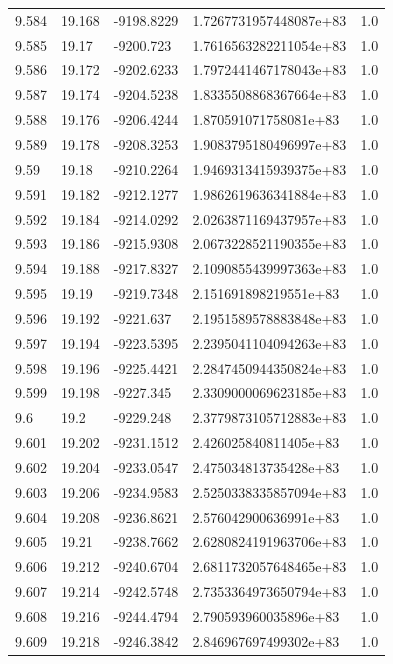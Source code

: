 \begin{tabular}{lllll}
9.584 & 19.168 & -9198.8229 & 1.7267731957448087e+83 & 1.0 \\
9.585 & 19.17 & -9200.723 & 1.7616563282211054e+83 & 1.0 \\
9.586 & 19.172 & -9202.6233 & 1.7972441467178043e+83 & 1.0 \\
9.587 & 19.174 & -9204.5238 & 1.8335508868367664e+83 & 1.0 \\
9.588 & 19.176 & -9206.4244 & 1.870591071758081e+83 & 1.0 \\
9.589 & 19.178 & -9208.3253 & 1.9083795180496997e+83 & 1.0 \\
9.59 & 19.18 & -9210.2264 & 1.9469313415939375e+83 & 1.0 \\
9.591 & 19.182 & -9212.1277 & 1.9862619636341884e+83 & 1.0 \\
9.592 & 19.184 & -9214.0292 & 2.0263871169437957e+83 & 1.0 \\
9.593 & 19.186 & -9215.9308 & 2.0673228521190355e+83 & 1.0 \\
9.594 & 19.188 & -9217.8327 & 2.1090855439997363e+83 & 1.0 \\
9.595 & 19.19 & -9219.7348 & 2.151691898219551e+83 & 1.0 \\
9.596 & 19.192 & -9221.637 & 2.1951589578883848e+83 & 1.0 \\
9.597 & 19.194 & -9223.5395 & 2.2395041104094263e+83 & 1.0 \\
9.598 & 19.196 & -9225.4421 & 2.2847450944350824e+83 & 1.0 \\
9.599 & 19.198 & -9227.345 & 2.3309000069623185e+83 & 1.0 \\
9.6 & 19.2 & -9229.248 & 2.3779873105712883e+83 & 1.0 \\
9.601 & 19.202 & -9231.1512 & 2.426025840811405e+83 & 1.0 \\
9.602 & 19.204 & -9233.0547 & 2.475034813735428e+83 & 1.0 \\
9.603 & 19.206 & -9234.9583 & 2.5250338335857094e+83 & 1.0 \\
9.604 & 19.208 & -9236.8621 & 2.576042900636991e+83 & 1.0 \\
9.605 & 19.21 & -9238.7662 & 2.6280824191963706e+83 & 1.0 \\
9.606 & 19.212 & -9240.6704 & 2.6811732057648465e+83 & 1.0 \\
9.607 & 19.214 & -9242.5748 & 2.7353364973650794e+83 & 1.0 \\
9.608 & 19.216 & -9244.4794 & 2.790593960035896e+83 & 1.0 \\
9.609 & 19.218 & -9246.3842 & 2.846967697499302e+83 & 1.0 \\

\end{tabular}

